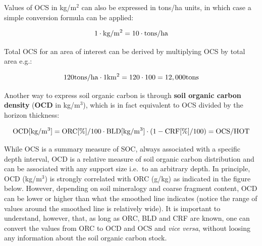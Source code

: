 \documentclass[graybox,natbib,nospthms,UStrade]{svmono}
\begin{document}
Values of OCS in kg/m\(^2\) can also be expressed in tons/ha units, in which case a simple conversion formula can be applied:

\begin{equation}
1 \cdot {\rm kg/m^2} = 10 \cdot {\rm tons/ha}
\label{eq:kgm2}
\end{equation}

Total OCS for an area of interest can be derived by multiplying OCS by total area e.g.:

\begin{equation}
120 {\rm tons/ha} \cdot 1 {\rm km^2} = 120 \cdot 100 = 12,000 {\rm tons}
\label{eq:tonsha}
\end{equation}

Another way to express soil organic carbon is through \textbf{soil organic carbon density} (\textbf{OCD} in kg/m\(^3\)), which is in fact equivalent to OCS divided by the horizon thickness:

\begin{equation}
{\rm OCD} [{\rm kg/m^3}] = {\rm ORC} [\%]/100 \cdot {\rm BLD} [{\rm kg/m^3}] \cdot (1- {\rm CRF} [\%]/100) = {\rm OCS} / {\rm HOT}
\label{eq:ocd}
\end{equation}

While OCS is a summary measure of SOC, always associated with a specific depth interval, OCD is a relative measure of soil organic carbon distribution and can be associated with any support size i.e.~to an arbitrary depth. In principle, OCD (kg/m\(^3\)) is strongly correlated with ORC (g/kg) as indicated in the figure below. However, depending on soil mineralogy and coarse fragment content, OCD can be lower or higher than what the smoothed line indicates (notice the range of values around the smoothed line is relatively wide). It is important to understand, however, that, as long as ORC, BLD and CRF are known, one can convert the values from ORC to OCD and OCS and \emph{vice versa}, without loosing any information about the soil organic carbon stock.
\end{document}
